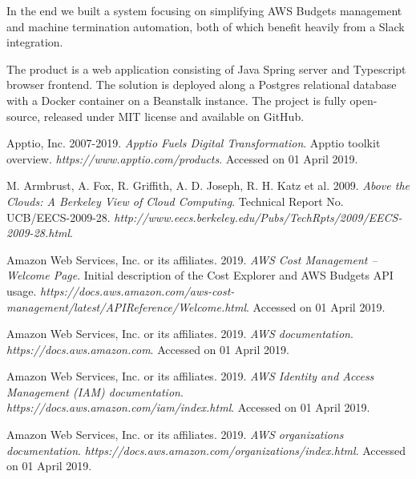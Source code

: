 \documentclass[licencjacka,en]{thesisclass}
\begin{document}
    In the end we built a system focusing on simplifying AWS Budgets management
    and machine termination automation,
    both of which benefit heavily from a Slack integration.

    The product is a web application consisting of Java Spring server
    and Typescript browser frontend.
    The solution is deployed along a Postgres relational database with a Docker container
    on a Beanstalk instance.
    The project is fully open-source, released under MIT license
    and available on GitHub.


    \begin{thebibliography}{99}

        Apptio, Inc. 2007-2019.
        \textit{Apptio Fuels Digital Transformation}.
        Apptio toolkit overview.
        \textit{https://www.apptio.com/products}.
        Accessed on 01 April 2019.

        M. Armbrust, A. Fox, R. Griffith, A. D. Joseph, R. H. Katz et al. 2009.
        \textit{Above the Clouds: A Berkeley View of Cloud Computing}.
        Technical Report No. UCB/EECS-2009-28.
        \textit{http://www.eecs.berkeley.edu/Pubs/TechRpts/2009/EECS-2009-28.html}.

        Amazon Web Services, Inc. or its affiliates. 2019.
        \textit{AWS Cost Management -- Welcome Page}.
        Initial description of the Cost Explorer and AWS Budgets API usage.
        \textit{https://docs.aws.amazon.com/aws-cost-management/latest/APIReference/Welcome.html}.
        Accessed on 01 April 2019.

        Amazon Web Services, Inc. or its affiliates. 2019.
        \textit{AWS documentation}.
        \textit{https://docs.aws.amazon.com}.
        Accessed on 01 April 2019.

        Amazon Web Services, Inc. or its affiliates. 2019.
        \textit{AWS Identity and Access Management (IAM) documentation}.
        \textit{https://docs.aws.amazon.com/iam/index.html}.
        Accessed on 01 April 2019.

        Amazon Web Services, Inc. or its affiliates. 2019.
        \textit{AWS organizations documentation}.
        \textit{https://docs.aws.amazon.com/organizations/index.html}.
        Accessed on 01 April 2019.


\end{thebibliography}
\end{document}
